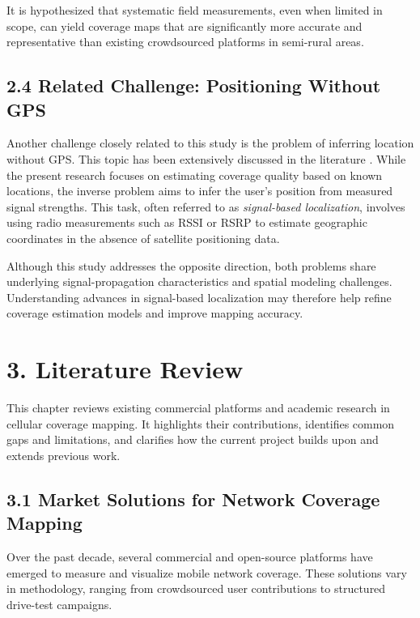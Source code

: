 \documentclass[11pt]{article}
\begin{document}
It is hypothesized that systematic field measurements, even when limited
in scope, can yield coverage maps that are significantly more accurate
and representative than existing crowdsourced platforms in semi-rural
areas.

\hypertarget{related-challenge}{%
\subsection{2.4 Related Challenge: Positioning Without GPS}\label{related-challenge}}

Another challenge closely related to this study is the problem of inferring location without GPS. This topic has been extensively discussed in the literature \cite{youssef2005locating,bahl2000radar,kaplan2017}. 
While the present research focuses on estimating coverage quality based on known locations, the inverse problem aims to infer the user’s position from measured signal strengths. 
This task, often referred to as \emph{signal-based localization}, involves using radio measurements such as RSSI or RSRP to estimate geographic coordinates in the absence of satellite positioning data.

Although this study addresses the opposite direction, both problems share underlying signal-propagation characteristics and spatial modeling challenges. Understanding advances in signal-based localization may therefore help refine coverage estimation models and improve mapping accuracy.

\hypertarget{literature-review}{%
\section{3. Literature Review}\label{literature-review}}

This chapter reviews existing commercial platforms and academic research
in cellular coverage mapping. It highlights their contributions,
identifies common gaps and limitations, and clarifies how the current
project builds upon and extends previous work.

\hypertarget{market-solutions-for-network-coverage-mapping}{%
\subsection{3.1 Market Solutions for Network Coverage
Mapping}\label{market-solutions-for-network-coverage-mapping}}

Over the past decade, several commercial and open-source platforms have
emerged to measure and visualize mobile network coverage. These
solutions vary in methodology, ranging from crowdsourced user
contributions to structured drive-test campaigns.
\end{document}

